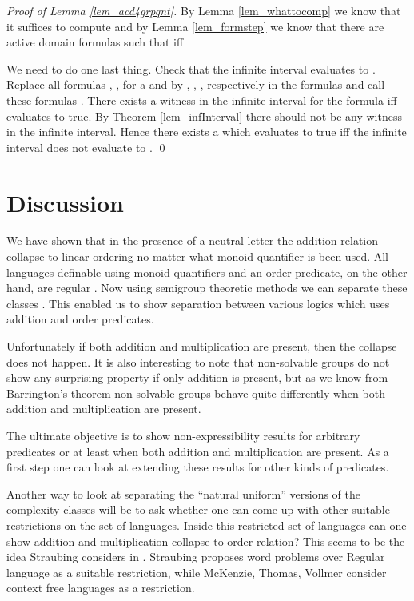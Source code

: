 \documentclass[envcountsame]{llncs}
\begin{document}
\begin{proof}[Proof of Lemma \ref{lem_acd4grpqnt}] 
By Lemma \ref{lem_whattocomp} we know that it suffices to compute  and by Lemma \ref{lem_formstep} we know that there are
active domain formulas  such that  iff 

We need to do one last thing. Check that the infinite interval evaluates to . Replace all formulas , ,  for
a  and  by , , ,  respectively in the formulas  and call these formulas . 
There exists a witness in the infinite interval for the formula  iff  evaluates to true. 
By Theorem \ref{lem_infInterval} there should not be any witness in the infinite interval. Hence there exists a  which
evaluates to true iff the infinite interval does not evaluate to .
\qed \end{proof}

\bigskip


\bigskip
\section{Discussion}
We have shown that in the presence of a neutral letter the addition relation collapse to linear ordering no matter what monoid
quantifier is been used. All languages definable using monoid quantifiers and an order predicate, on the other hand, are regular \cite{barr_uniformNC1}. 
Now using semigroup theoretic methods we can separate these classes \cite{str_cirBook}. This enabled us to show separation between
various logics which uses addition and order predicates. 


Unfortunately if both addition and multiplication are present, then the collapse does not happen. It is also interesting to note that non-solvable
groups do not show any surprising property if only addition is present, but as we know from Barrington's theorem non-solvable groups
behave quite differently when both addition and multiplication are present.

The ultimate objective is to show non-expressibility results for arbitrary predicates or at least when both addition and multiplication
are present. As a first step one can look at extending these results for other kinds of predicates. 

Another way to look at separating the ``natural uniform'' versions of the complexity classes will be to ask whether one can come up
with other suitable restrictions on the set of languages. Inside this restricted set of languages can one show addition and
multiplication collapse to order relation? This seems to be the idea Straubing considers in \cite{str_inexpRegLan}. Straubing
\cite{str_cirBook} proposes word problems over Regular language as a suitable restriction, while McKenzie, Thomas, Vollmer \cite{mckenzie_extUniformity} consider context free languages as a restriction.
\end{document}
